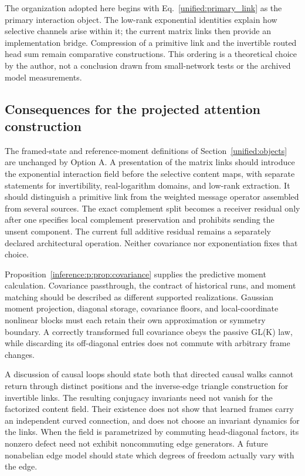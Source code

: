\documentclass[11pt]{article}
\theoremstyle{definition}
\theoremstyle{remark}
\begin{document}
The organization adopted here begins with Eq.~\eqref{unified:primary_link} as the primary interaction object. The low-rank exponential identities explain how selective channels arise within it; the current matrix links then provide an implementation bridge. Compression of a primitive link and the invertible routed head sum remain comparative constructions. This ordering is a theoretical choice by the author, not a conclusion drawn from small-network tests or the archived model measurements.

\subsection{Consequences for the projected attention construction}

The framed-state and reference-moment definitions of Section~\ref{unified:objects} are unchanged by Option A. A presentation of the matrix links should introduce the exponential interaction field before the selective content maps, with separate statements for invertibility, real-logarithm domains, and low-rank extraction. It should distinguish a primitive link from the weighted message operator assembled from several sources. The exact complement split becomes a receiver residual only after one specifies local complement preservation and prohibits sending the unsent component. The current full additive residual remains a separately declared architectural operation. Neither covariance nor exponentiation fixes that choice.

Proposition~\ref{inference:p:prop:covariance} supplies the predictive moment calculation. Covariance passthrough, the contract of historical runs, and moment matching should be described as different supported realizations. Gaussian moment projection, diagonal storage, covariance floors, and local-coordinate nonlinear blocks must each retain their own approximation or symmetry boundary. A correctly transformed full covariance obeys the passive GL(K) law, while discarding its off-diagonal entries does not commute with arbitrary frame changes.

A discussion of causal loops should state both that directed causal walks cannot return through distinct positions and the inverse-edge triangle construction for invertible links. The resulting conjugacy invariants need not vanish for the factorized content field. Their existence does not show that learned frames carry an independent curved connection, and does not choose an invariant dynamics for the links. When the field is parametrized by commuting head-diagonal factors, its nonzero defect need not exhibit noncommuting edge generators. A future nonabelian edge model should state which degrees of freedom actually vary with the edge.
\end{document}
